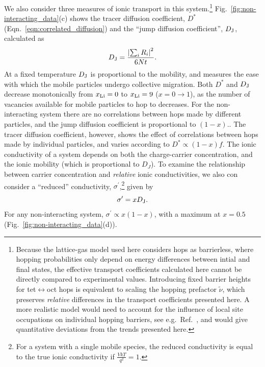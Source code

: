 \documentclass[aps,prb,twocolumn,superscriptaddress,reprint]{revtex4-1}
\newcommand{\xLi}{x_\m{Li}}
\newcommand{\hrpa}{{\widetilde{\nu}}}
\begin{document}
We also consider three measures of ionic transport in this system.\footnote{Because the lattice-gas model used here considers hops as barrierless, where hopping probabilities only depend on  energy differences between intial and final states, the effective transport coefficients calculated here cannot be directly compared to experimental values. 
Introducing fixed barrier heights for tet$\leftrightarrow$oct hops is equivalent to scaling the hopping prefactor $\hrpa$, which preserves \emph{relative} differences in the transport coefficients presented here. 
A more realistic model would need to account for the influence of local site occupations on individual hopping barriers, see e.g.\ Ref.\ \cite{VanderVenAndCeder_HandbookofMaterialsModelling2010}, and would give quantitative deviations from the trends presented here.} Fig.~\ref{fig:non-interacting_data}(c) shows the tracer diffusion coefficient, $D^*$ (Eqn.~\ref{eqn:correlated_diffusion}) and the ``jump diffusion coefficient'', $D_{\mathrm{J}}$\cite{VanDerVenEtAl_AccChemRes2013}, calculated as
\begin{equation}
  D_{\mathrm{J}}=\frac{\left|\sum_iR_i\right|^2}{6Nt}.
\end{equation}
At a fixed temperature $D_{\mathrm{J}}$ is proportional to the mobility, and measures the ease with which the mobile particles undergo collective migration. 
Both $D^*$ and $D_{\mathrm{J}}$ decrease monotonically from $\xLi=0$ to $\xLi=9$ ($x=0\to1$), as the number of vacancies available for mobile particles to hop to decreases. 
For the non-interacting system there are no correlations between hops made by different particles, and the jump diffusion coefficient is proportional to $(1-x)$.\cite{Kutner_PhysLett1981,VanDerVenEtAl_AccChemRes2013}. 
The tracer diffusion coefficient, however, shows the effect of correlations between hops made by individual particles, and varies according to $D^*\propto(1-x)f$. 
The ionic conductivity of a system depends on both the charge-carrier concentration, and the ionic mobility (which is proportional to $D_J$). 
To examine the relationship between carrier concentration and \emph{relative} ionic conductivities, we also con consider a ``reduced'' conductivity, $\sigma^\prime$,\footnote{For a system with a single mobile species, the reduced conductivity is equal to the true ionic conductivity if $\frac{VkT}{q^2}=1$.} given by
\begin{equation}
  \sigma^\prime = xD_{\mathrm{J}}.
\end{equation}
For any non-interacting system, $\sigma^\prime\propto x\left(1-x\right)$, with a maximum at $x=0.5$ (Fig.~\ref{fig:non-interacting_data}(d)).
\end{document}
